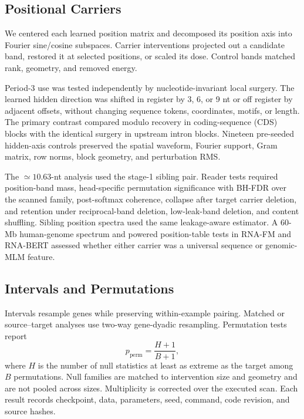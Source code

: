\documentclass{article}
\begin{document}
\subsection{Positional Carriers}
\label{sec:carrier-methods}

We centered each learned position matrix and decomposed its position axis into Fourier sine/cosine subspaces. Carrier interventions projected out a candidate band, restored it at selected positions, or scaled its dose. Control bands matched rank, geometry, and removed energy.

Period-3 use was tested independently by nucleotide-invariant local surgery. The learned hidden direction was shifted in register by 3, 6, or 9 nt or off register by adjacent offsets, without changing sequence tokens, coordinates, motifs, or length. The primary contrast compared modulo recovery in coding-sequence (CDS) blocks with the identical surgery in upstream intron blocks. Nineteen pre-seeded hidden-axis controls preserved the spatial waveform, Fourier support, Gram matrix, row norms, block geometry, and perturbation RMS.

The \(\simeq10.63\)-nt analysis used the stage-1 sibling pair. Reader tests required position-band mass, head-specific permutation significance with BH-FDR over the scanned family, post-softmax coherence, collapse after target carrier deletion, and retention under reciprocal-band deletion, low-leak-band deletion, and content shuffling. Sibling position spectra used
the same leakage-aware estimator. A 60-Mb human-genome spectrum and powered
position-table tests in RNA-FM and RNA-BERT assessed whether either carrier was
a universal sequence or genomic-MLM feature.

\subsection{Intervals and Permutations}
\label{sec:inference}

Intervals resample genes while preserving within-example pairing. Matched or source--target analyses use two-way gene-dyadic resampling. Permutation tests report
\begin{equation}
  p_{\mathrm{perm}}=\frac{H+1}{B+1},
\end{equation}
where \(H\) is the number of null statistics at least as extreme as the target among \(B\) permutations. Null families are matched to intervention size and geometry and are not pooled across sizes. Multiplicity is corrected over the executed scan. Each result records checkpoint, data, parameters, seed, command, code revision, and source hashes.
\end{document}
